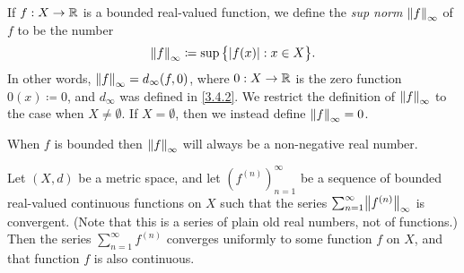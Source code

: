 \setcounter{thm}{4}
\begin{defn}\label{3.5.5}
  If \(f : X \to \R\) is a bounded real-valued function, we define the \emph{sup norm} \(\norm*{f}_\infty\) of \(f\) to be the number
  \[
    \norm*{f}_\infty \coloneqq \sup\big\{\abs{f(x)} : x \in X\big\}.
  \]
  In other words, \(\norm*{f}_\infty = d_\infty(f, 0)\), where \(0 : X \to \R\) is the zero function \(0(x) \coloneqq 0\), and \(d_\infty\) was defined in \cref{3.4.2}.
  We restrict the definition of \(\norm*{f}_\infty\) to the case when \(X \neq \emptyset\).
  If \(X = \emptyset\), then we instead define \(\norm*{f}_\infty = 0\).
\end{defn}

\begin{note}
  When \(f\) is bounded then \(\norm*{f}_\infty\) will always be a non-negative real number.
\end{note}

\setcounter{thm}{6}
\begin{thm}\label{3.5.7}
  Let \((X, d)\) be a metric space, and let \((f^{(n)})_{n = 1}^\infty\) be a sequence of bounded real-valued continuous functions on \(X\) such that the series \(\sum_{n = 1}^\infty \norm*{f^{(n)}}_\infty\) is convergent.
  (Note that this is a series of plain old real numbers, not of functions.)
  Then the series \(\sum_{n = 1}^\infty f^{(n)}\) converges uniformly to some function \(f\) on \(X\), and that function \(f\) is also continuous.
\end{thm}

